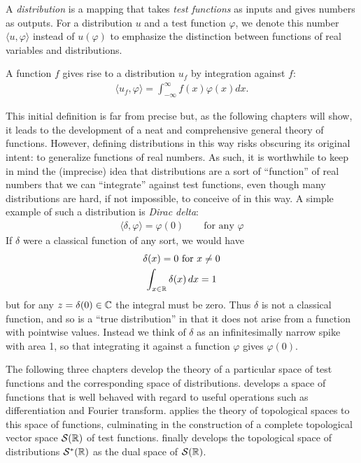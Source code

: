     \begin{defn}
      A \emph{distribution} is a mapping that takes \emph{test functions} as inputs and gives numbers as outputs.
      For a distribution $u$ and a test function $\varphi$, we denote this number $\langle u, \varphi \rangle$ instead of $u(\varphi)$ to emphasize the distinction between functions of real variables and distributions.

      A function $f$ gives rise to a distribution $u_f$ by integration against $f$:
      \begin{align*}
        \langle u_f, \varphi \rangle = \int_{-\infty}^{\infty} f(x)\varphi(x)dx \text{.}
      \end{align*}

    \end{defn}

    This initial definition is far from precise but, as the following chapters will show, it leads to the development of a neat and comprehensive general theory of functions.
    However, defining distributions in this way risks obscuring its original intent: to generalize functions of real numbers.
    As such, it is worthwhile to keep in mind the (imprecise) idea that distributions are a sort of ``function'' of real numbers that we can ``integrate'' against test functions, even though many distributions are hard, if not impossible, to conceive of in this way.
    A simple example of such a distribution is \emph{Dirac delta}:
    \begin{gather*}
      \langle\delta,\varphi\rangle = \varphi(0)
      \qquad\text{for any }\varphi
    \end{gather*}
    If $\delta$ were a classical function of any sort, we would have
    \begin{gather*}
      \delta(x)=0\text{ for }x\ne0\\
      \int_{x\in\mathbb{R}} \delta(x)\,dx = 1
    \end{gather*}
    but for any $z=\delta(0)\in\mathbb{C}$ the integral must be zero.
    Thus $\delta$ is not a classical function, and so is a ``true distribution'' in that it does not arise from a function with pointwise values.
    Instead we think of $\delta$ as an infinitesimally narrow spike with area 1, so that integrating it against a function $\varphi$ gives $\varphi(0)$.
  
    The following three chapters develop the theory of a particular space of test functions and the corresponding space of distributions.
     develops a space of functions that is well behaved with regard to useful operations such as differentiation and Fourier transform.
     applies the theory of topological spaces to this space of functions, culminating in the construction of a complete topological vector space $\mathcal{S}(\mathbb{R})$ of test functions.
     finally develops the topological space of distributions $\mathcal{S}^*(\mathbb{R})$ as the dual space of $\mathcal{S}(\mathbb{R})$. 


